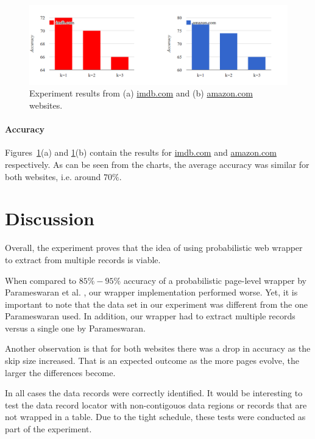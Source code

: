 \begin{figure}[h]
	\centering
	\includegraphics[width=1.0\textwidth]{figures/accuracy}
	\caption{Experiment results from (a) \url{imdb.com} and (b) \url{amazon.com} websites.}
	\label{fig:accuracy}
\end{figure}

\paragraph{Accuracy} Figures~\ref{fig:accuracy}(a) and \ref{fig:accuracy}(b) contain the results for \url{imdb.com} and \url{amazon.com} respectively. As can be seen from the charts, the average accuracy was similar for both websites, i.e. around $70\%$. 


\section{Discussion}

Overall, the experiment proves that the idea of using probabilistic web wrapper to extract from multiple records is viable.

When compared to $85\%-95\%$ accuracy of a probabilistic page-level wrapper by Parameswaran et al. \cite{DBLP:journals/pvldb/ParameswaranDGR11}, our wrapper implementation performed worse. Yet, it is important to note that the data set in our experiment was different from the one Parameswaran used. In addition, our wrapper had to extract multiple records versus a single one by Parameswaran.

Another observation is that for both websites there was a drop in accuracy as the skip size increased. That is an expected outcome as the more pages evolve, the larger the differences become.

In all cases the data records were correctly identified. It would be interesting to test the data record locator with non-contigouos data regions or records that are not wrapped in a table. Due to the tight schedule, these tests were conducted as part of the experiment.


